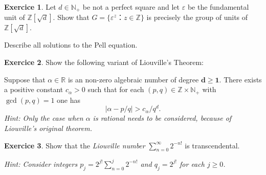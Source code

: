 \documentclass[12pt,a4paper]{article}
\theoremstyle{plain}
\newtheorem*{Sol*}{Solution}
\theoremstyle{definition}
\newtheorem{Ex}{Exercice}
\newif\ifsolutions
\newcommand{\exercise}[2]{
			\begin{Ex} #1 \end{Ex}
			\ifsolutions  \begin{Sol*} #2 \end{Sol*} \bigskip \else \bigskip  \fi
		}
\begin{document}
\exercise{ Let $d ∈ ℕ_+$ be not a perfect square and let $ε$ be the fundamental unit of $ℤ[\sqrt{d}]$. Show that $G = \{ ε ^z ： z ∈ℤ\}$  is precisely the group of units of $ℤ[\sqrt{d}]$.

  \bigskip
  
  \noindent
  Describe all solutions to the Pell equation. 
}{}



\exercise{
  Show the following variant of Liouville's Theorem:

  \bigskip 
  
  \noindent  
    Suppose that $α∈ ℝ$ is an non-zero algebraic number of degree $\mathbf{d ≥1}$. There exists a positive constant $c_α>0$ such that for each $(p,q) ∈ ℤ×ℕ_+$ with $\gcd(p,q) = 1$ one has
  \begin{displaymath}
    |α - p/q| > c_α/q^d. 
  \end{displaymath}
\smallskip 
\noindent 
\emph{Hint: Only the case when $α$ is rational needs to be considered, because of Liouville's original theorem.}
}{}


\exercise{Show that the \emph{Liouville number} $∑_{n=0}^{∞} 2^{-n!}$ is transcendental.

  \bigskip

\emph{Hint:   Consider integers  $p_j = 2^{j!} ∑_{n=0}^j 2^{-n!}$ and $q_j = 2^{j!}$ for each $j \geq 0$. }
  
}{}
  
\end{document}
